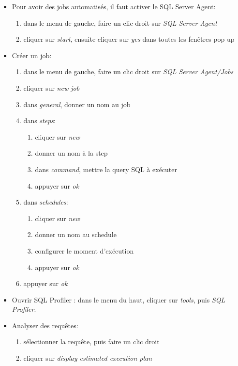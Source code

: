 \documentclass[a4paper]{article}
\begin{document}
\begin{itemize}



\item Pour avoir des jobs automatisés, il faut activer le SQL Server Agent:
\begin{enumerate}
    \item dans le menu de gauche, faire un clic droit sur \textit{SQL Server Agent}
    \item cliquer sur \textit{start}, ensuite cliquer sur \textit{yes} dans toutes les fenêtres pop up
\end{enumerate}



\item Créer un job:
\begin{enumerate}
    \item dans le menu de gauche, faire un clic droit sur \textit{SQL Server Agent/Jobs}
    \item cliquer sur \textit{new job}
    \item dans \textit{general}, donner un nom au job
    \item dans \textit{steps}:
    \begin{enumerate}
        \item cliquer sur \textit{new}
        \item donner un nom à la step
        \item dans \textit{command}, mettre la query SQL à exécuter
        \item appuyer sur \textit{ok}
    \end{enumerate}
    \item dans \textit{schedules}:
    \begin{enumerate}
        \item cliquer sur \textit{new}
        \item donner un nom au schedule
        \item configurer le moment d'exécution
        \item appuyer sur \textit{ok}
    \end{enumerate}
    \item appuyer sur \textit{ok}
\end{enumerate}



\item Ouvrir SQL Profiler : dans le menu du haut, cliquer sur \textit{tools}, puis \textit{SQL Profiler}.



\item Analyser des requêtes:
\begin{enumerate}
    \item sélectionner la requête, puis faire un clic droit
    \item cliquer sur \textit{display estimated execution plan}
\end{enumerate}



\end{itemize}
\end{document}

